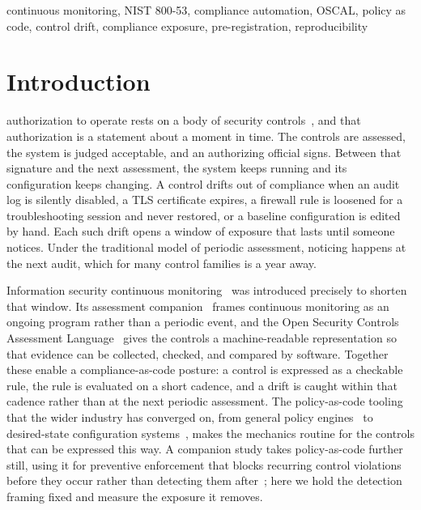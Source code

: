 \documentclass[journal]{IEEEtran}
\begin{document}
\begin{IEEEkeywords}
continuous monitoring, NIST 800-53, compliance automation, OSCAL, policy as code, control drift,
compliance exposure, pre-registration, reproducibility
\end{IEEEkeywords}

\section{Introduction}
 authorization to operate rests on a body of security
controls~\cite{nist80053}, and that authorization is a statement about a moment in time. The
controls are assessed, the system is judged acceptable, and an authorizing official signs. Between
that signature and the next assessment, the system keeps running and its configuration keeps
changing. A control drifts out of compliance when an audit log is silently disabled, a TLS
certificate expires, a firewall rule is loosened for a troubleshooting session and never restored,
or a baseline configuration is edited by hand. Each such drift opens a window of exposure that
lasts until someone notices. Under the traditional model of periodic assessment, noticing happens
at the next audit, which for many control families is a year away.

Information security continuous monitoring~\cite{nist80137} was introduced precisely to shorten
that window. Its assessment companion~\cite{nist80137a} frames continuous monitoring as an ongoing
program rather than a periodic event, and the Open Security Controls Assessment
Language~\cite{oscal} gives the controls a machine-readable representation so that evidence can be
collected, checked, and compared by software. Together these enable a compliance-as-code posture:
a control is expressed as a checkable rule, the rule is evaluated on a short cadence, and a drift
is caught within that cadence rather than at the next periodic assessment. The policy-as-code
tooling that the wider industry has converged on, from general policy engines~\cite{opa} to
desired-state configuration systems~\cite{powershelldsc}, makes the mechanics routine for the
controls that can be expressed this way. A companion study takes policy-as-code further still, using
it for preventive enforcement that blocks recurring control violations before they occur rather than
detecting them after~\cite{paper13policy}; here we hold the detection framing fixed and measure the
exposure it removes.
\end{document}

